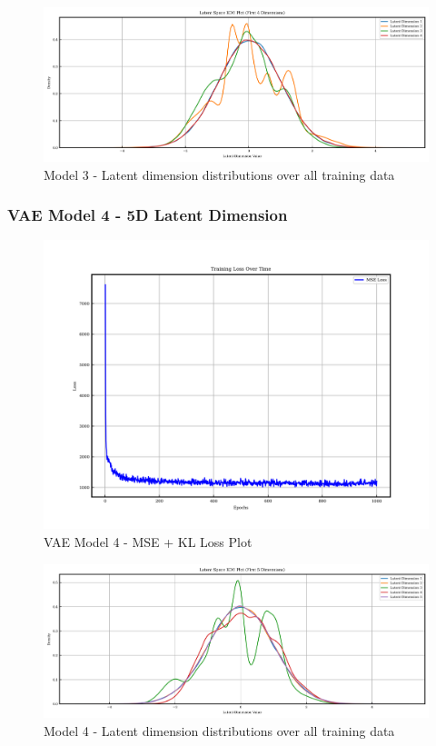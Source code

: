\documentclass{article}
\begin{document}
\begin{figure}[H]
    \centering
    \includegraphics[width=0.75\linewidth]{figures/VAEmodels/model3/latent_distribution.png}
    \caption{Model 3 - Latent dimension distributions over all training data}
    \label{fig:model3_latent_dist}
\end{figure}

\subsubsection{VAE Model 4 - 5D Latent Dimension}

\begin{figure}[H]
\centering
    \includegraphics[width=0.75\linewidth]{figures/VAEmodels/model4/loss_plot.png}
    \caption{VAE Model 4 - MSE + KL Loss Plot}
    \label{fig:model4_loss_plot}
\end{figure}

\begin{figure}[H]
    \centering
    \includegraphics[width=0.75\linewidth]{figures/VAEmodels/model4/latent_distribution.png}
    \caption{Model 4 - Latent dimension distributions over all training data}
    \label{fig:model4_latent_dist}
\end{figure}
\end{document}
